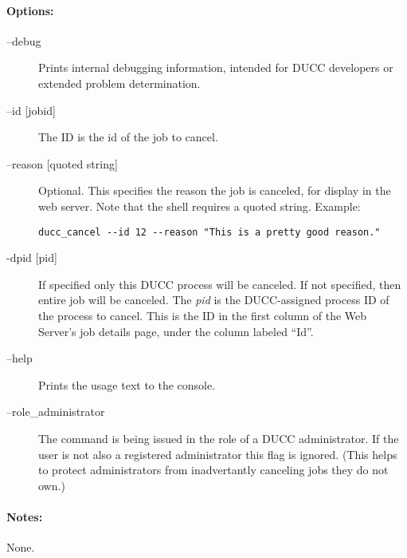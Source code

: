     \paragraph{Options:}
    \begin{description}
        \item[--debug ]          
          Prints internal debugging information, intended for DUCC developers or extended problem determination.                    
        \item[--id {[jobid]}]
          The ID is the id of the job to cancel.
        \item[--reason {[quoted string]}]
          Optional. This specifies the reason the job is canceled, for display in the web server. Note that
          the shell requires a quoted string.  Example:
\begin{verbatim}
ducc_cancel --id 12 --reason "This is a pretty good reason."
\end{verbatim}
        \item[-dpid {[pid]}]
          If specified only this DUCC process will be canceled.  If not
          specified, then entire job will be canceled.  The {\em pid} is the DUCC-assigned process ID of the
          process to cancel.  This is the ID in the first column of the Web Server's job details page, under
          the column labeled ``Id''.
        \item[--help]
          Prints the usage text to the console. 
        \item[--role\_administrator] The command is being issued in the role of a DUCC administrator.
          If the user is not also a registered administrator this flag is ignored.  (This helps to
          protect administrators from inadvertantly canceling jobs they do not own.)
     \end{description}
        
    \paragraph{Notes:}
    None.

